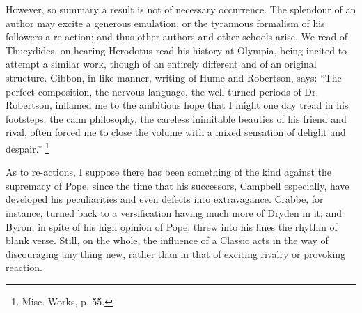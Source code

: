 However, so summary a result is not of necessary occurrence. The
splendour of an author may excite a generous emulation, or the
tyrannous formalism of his followers a re-action; and thus other
authors and other schools arise. We read of Thucydides, on hearing
Herodotus read his history at Olympia, being incited to attempt a
similar work, though of an entirely different and of an original
structure. Gibbon, in like manner, writing of Hume and Robertson,
says: ``The perfect composition, the nervous language, the
well-turned periods of Dr. Robertson, inflamed me to the ambitious
hope that I might one day tread in his footsteps; the calm philosophy,
the careless inimitable beauties of his friend and rival, often forced
me to close the volume with a mixed sensation of delight and
despair.'' \footnote{Misc. Works, p.
55.}

As to re-actions, I suppose there has been something of the kind
against the supremacy of Pope, since the time that his
successors, Campbell especially, have developed his peculiarities and
even defects into extravagance. Crabbe, for instance, turned back to a
versification having much more of Dryden in it; and Byron, in spite of
his high opinion of Pope, threw into his lines the rhythm of blank
verse. Still, on the whole, the influence of a Classic acts in the way
of discouraging any thing new, rather than in that of exciting rivalry
or provoking reaction.

